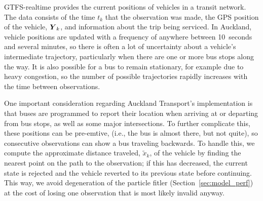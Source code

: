 GTFS-realtime provides the current positions of vehicles in a transit network.
The data consists of the time $t_k$ that the observation was made,
the GPS position of the vehicle, $\mbox{$\boldsymbol{Y}$}_k$, 
and information about the trip being serviced.
In Auckland, vehicle positions are updated with a frequency of anywhere between 10~seconds and several minutes,
so there is often a lot of uncertainty about a vehicle's intermediate trajectory,
particularly when there are one or more bus stops along the way.
It is also possible for a bus to remain stationary,
for example due to heavy congestion,
so the number of possible trajectories rapidly increases with 
the time between observations.


One important consideration regarding Auckland Transport's \rt implementation is that
buses are programmed to report their location when arriving at or departing from
bus stops, as well as some major intersections.
To further complicate this,
these positions can be pre-emtive,
(i.e., the bus is almost there, but not quite),
so consecutive observations can show a bus traveling backwards.
To handle this, we compute the approximate distance traveled, $\tilde x_k$,
of the vehicle by finding the nearest point on the path to the observation;
if this has decreased, the current state is rejected and the vehicle reverted
to its previous state before continuing.
This way, we avoid degeneration of the particle fitler (Section~\ref{sec:model_perf})
at the cost of losing one observation that is most likely invalid anyway.

